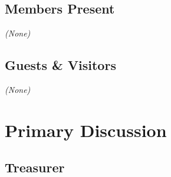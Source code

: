 \documentclass[10pt,letterpaper]{article}
\begin{document}
\subsection{Members Present}
\emph{(None)}

\subsection{Guests \& Visitors}
\emph{(None)}

\section{Primary Discussion}

\subsection{Treasurer}
\end{document}
